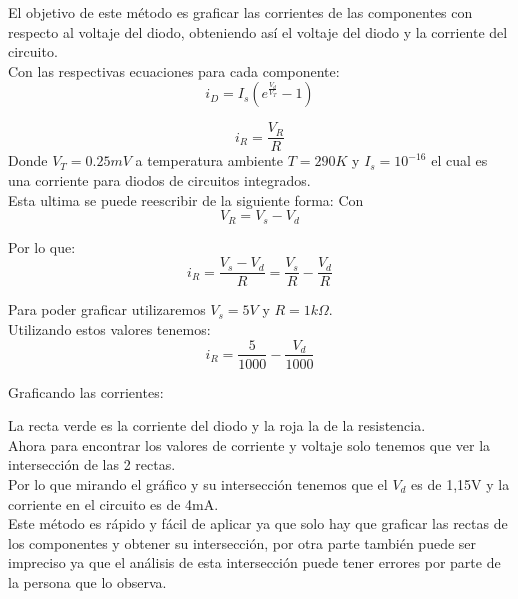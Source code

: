 \documentclass[11pt,fancy,lang=es]{elegantbook}
\begin{document}
El objetivo de este método es graficar las corrientes de las componentes con respecto al voltaje del diodo, obteniendo así el voltaje del diodo y la corriente del circuito.\\

Con las respectivas ecuaciones para cada componente:
\begin{equation*}
    i_D = I_s(e^{{\frac{V_d}{V_T}}}-1)
\end{equation*}

\begin{equation*}
    i_R = \frac{V_R}{R}
\end{equation*}
Donde $V_T = 0.25mV$ a temperatura ambiente $ T = 290K $ y $ I_s = 10^{-16}$ el cual es una corriente para diodos de circuitos integrados.\\

Esta ultima se puede reescribir de la siguiente forma:
Con\begin{equation*}
    V_R = V_s - V_d
\end{equation*}

Por lo que:
\begin{equation*}
    i_R = \frac{V_s - V_d}{R} = \frac{V_s}{R}- \frac{V_d}{R}
\end{equation*}

Para poder graficar utilizaremos $V_s = 5V$ y $R= 1k\Omega$.\\

Utilizando estos valores tenemos:
\begin{equation*}
    i_R = \frac{5}{1000}- \frac{V_d}{1000}
\end{equation*}

\newpage
Graficando las corrientes:

\iffalse
\begin{figure}[!h]
    \centering
    \texttt{[image: image/metodoGrafico.png]}
    \caption{Gráfico $I$ vs $V_d$}
    \label{fig:my_label}
\end{figure}
\fi

La recta verde es la corriente del diodo y la roja la de la resistencia.\\
Ahora para encontrar los valores de corriente y voltaje solo tenemos que ver la intersección de las 2 rectas.\\

Por lo que mirando el gráfico y su intersección tenemos que el $V_d$ es de 1,15V y la corriente en el circuito es de 4mA.\\

Este método es rápido y fácil de aplicar ya que solo hay que graficar las rectas de los componentes y obtener su intersección, por otra parte también puede ser impreciso ya que el análisis de esta intersección puede tener errores por parte de la persona que lo observa.
\end{document}
